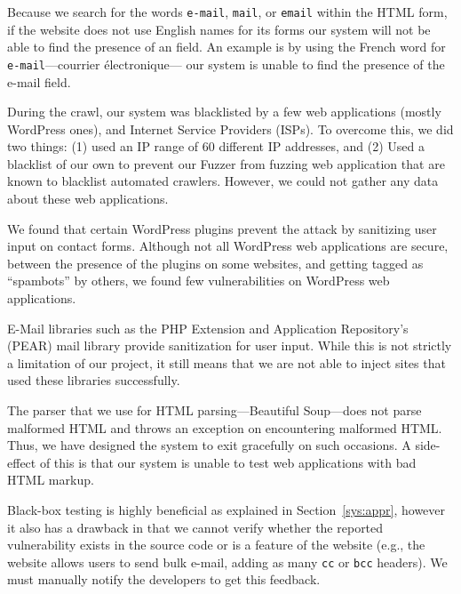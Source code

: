         Because we search for the words \texttt{e-mail}, \texttt{mail}, or \texttt{email} within the HTML form, if the website does not use English names for its forms our system will not be able to find the presence of an \email field. An example is by using the French word for \texttt{e-mail}---courrier {{\'e}}lectronique--- our system is unable to find the presence of the e-mail field. 
        
		During the crawl, our system was blacklisted by a few web
        applications (mostly WordPress ones), and Internet Service
        Providers (ISPs). To overcome this, we did two things: (1)
        used an IP range of 60 different IP addresses, and (2) Used a
        blacklist of our own to prevent our Fuzzer from fuzzing web
        application that are known to blacklist automated crawlers.
        However, we could not gather any data about these web
        applications.


		We found that certain WordPress plugins prevent the \ehi attack by sanitizing user input on contact forms. Although not all  WordPress web applications are secure, between the presence of the plugins on some websites, and getting tagged as ``spambots'' by others, we found few vulnerabilities on WordPress web applications.

        E-Mail libraries such as the PHP Extension and Application Repository's (PEAR) mail library provide sanitization for user input. While this is not strictly a limitation of our project, it still means that we are not able to inject sites that used these libraries successfully.

        The parser that we use for HTML parsing---Beautiful Soup---does not parse malformed HTML and throws an exception on encountering malformed HTML. Thus, we have designed the system to exit gracefully on such occasions. A side-effect of this is that our system is unable to test web applications with bad HTML markup.

        Black-box testing is highly beneficial as explained in Section~\ref{sys:appr}, however it also has a drawback in that we cannot verify whether the reported vulnerability exists in the source code or is a feature of the website (e.g., the website allows users to send bulk e-mail, adding as many \texttt{cc} or \texttt{bcc} headers). We must manually notify the developers to get this feedback.


